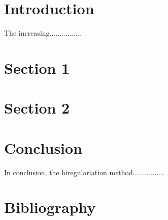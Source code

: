 \documentclass{article}
\begin{document}
\begin{titlepage}
	
	\vfill 
\end{titlepage}

\tableofcontents


\section*{Introduction}

The increasing................



\section{Section 1}
\section{Section 2}


\section*{Conclusion}

In conclusion, the biregulariation method................



\section{Bibliography}
\nocite{*}
\printbibliography
\end{document}
